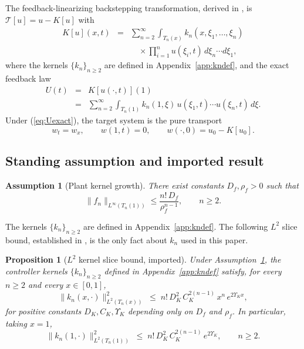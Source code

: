 \documentclass[10pt,a4paper]{amsart}
\newtheorem{proposition}{Proposition}
\newtheorem{assumption}{Assumption}
\newcommand{\Tcal}{\mathcal{T}}
\newcommand{\Linf}{L^\infty}
\newcommand{\Ltwo}{L^2}
\begin{document}
The feedback-linearizing backstepping transformation, derived in \cite{krstic2026feedbacklinearizationhyperbolicpdes}, is $\Tcal[u] = u - K[u]$ with
\begin{eqnarray}
K[u](x,t) &=& \sum_{n=2}^\infty \int_{T_n(x)} k_n(x,\xi_1,\ldots,\xi_n) \nonumber \\
&& \quad \times \prod_{i=1}^n u(\xi_i,t)\, d\xi_n \cdots d\xi_1,
\label{eq:Kdef}
\end{eqnarray}
where the kernels $\{k_n\}_{n \ge 2}$ are defined in Appendix~\ref{app:kndef}, and the exact feedback law
\begin{eqnarray}
U(t) &=& K[u(\cdot,t)](1) \nonumber \\
&=& \sum_{n=2}^\infty \int_{T_n(1)} k_n(1,\xi)\, u(\xi_1,t)\cdots u(\xi_n,t)\, d\xi.
\label{eq:Uexact}
\end{eqnarray}
Under (\ref{eq:Uexact}), the target system is the pure transport
\begin{equation}
w_t = w_x, \qquad w(1,t) = 0, \qquad w(\cdot,0) = u_0 - K[u_0].
\label{eq:target_exact}
\end{equation}

\subsection{Standing assumption and imported result}\label{sec:assumption}

\begin{assumption}[Plant kernel growth]\label{ass:fnbound}
There exist constants $D_f, \rho_f > 0$ such that
\begin{equation}
\|f_n\|_{\Linf(T_n(1))} \le \frac{n!\, D_f}{\rho_f^{n-1}}, \qquad n \ge 2.
\label{eq:fnbound}
\end{equation}
\end{assumption}

The kernels $\{k_n\}_{n \ge 2}$ are defined in Appendix~\ref{app:kndef}. The following $\Ltwo$ slice bound, established in \cite{krstic2026feedbacklinearizationhyperbolicpdes}, is the only fact about $k_n$ used in this paper.

\begin{proposition}[$\Ltwo$ kernel slice bound, imported]\label{prop:L2bound}
Under Assumption~\ref{ass:fnbound}, the controller kernels $\{k_n\}_{n\ge 2}$ defined in Appendix~\ref{app:kndef} satisfy, for every $n \ge 2$ and every $x \in [0,1]$,
\begin{equation}
\|k_n(x,\cdot)\|_{\Ltwo(T_n(x))}^2 \;\le\; n!\, D_K^2\, C_K^{2(n-1)}\, x^n\, e^{2\Upsilon_K x},
\label{eq:knL2}
\end{equation}
for positive constants $D_K, C_K, \Upsilon_K$ depending only on $D_f$ and $\rho_f$. In particular, taking $x = 1$,
\begin{equation}
\|k_n(1,\cdot)\|_{\Ltwo(T_n(1))}^2 \;\le\; n!\, D_K^2\, C_K^{2(n-1)}\, e^{2\Upsilon_K}, \qquad n \ge 2.
\label{eq:knL2_endpoint}
\end{equation}
\end{proposition}
\end{document}
